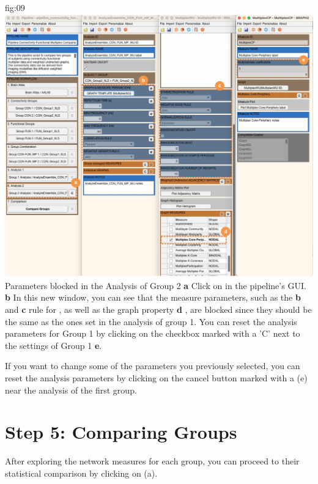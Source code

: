 \documentclass[justified]{tufte-handout}
\begin{document}
	{fig:09}
	{
	\includegraphics{fig09.jpg}
	}
	{Parameters blocked in the Analysis of Group 2}
	{
	{\bf a} Click on  in the pipeline's GUI.
	{\bf b} In this new window, you can see that the measure parameters, such as the {\bf b}  and {\bf c} rule for , as well as the graph property {\bf d} , are blocked since they should be the same as the ones set in the analysis of group 1. You can reset the analysis parameters for Group 1 by clicking on the checkbox marked with a 'C' next to the settings of Group 1 {\bf e}.
	}
	
If you want to change some of the parameters you previously selected, you can reset the analysis parameters by clicking on the cancel button marked with a  (e) near the analysis of the first group.
 
\clearpage
\section{Step 5: Comparing Groups}

After exploring the network measures for each group, you can proceed to their statistical comparison by clicking on  (a).
\end{document}
